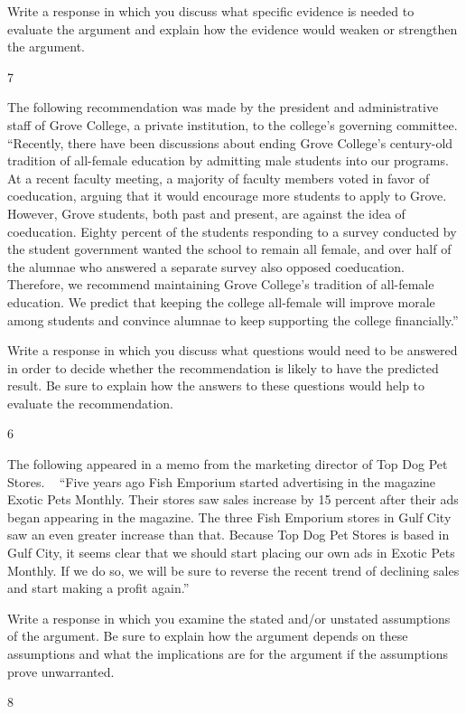 \documentclass[]{article}
\begin{document}
Write a response in which you discuss what specific evidence is needed
to evaluate the argument and explain how the evidence would weaken or
strengthen the argument.

7

The following recommendation was made by the president and
administrative staff of Grove College, a private institution, to the
college's governing committee. ``Recently, there have been discussions
about ending Grove College's century-old tradition of all-female
education by admitting male students into our programs. At a recent
faculty meeting, a majority of faculty members voted in favor of
coeducation, arguing that it would encourage more students to apply to
Grove. However, Grove students, both past and present, are against the
idea of coeducation. Eighty percent of the students responding to a
survey conducted by the student government wanted the school to remain
all female, and over half of the alumnae who answered a separate survey
also opposed coeducation. Therefore, we recommend maintaining Grove
College's tradition of all-female education. We predict that keeping the
college all-female will improve morale among students and convince
alumnae to keep supporting the college financially.''

Write a response in which you discuss what questions would need to be
answered in order to decide whether the recommendation is likely to have
the predicted result. Be sure to explain how the answers to these
questions would help to evaluate the recommendation.

6

The following appeared in a memo from the marketing director of Top Dog
Pet Stores. ~ ``Five years ago Fish Emporium started advertising in the
magazine Exotic Pets Monthly. Their stores saw sales increase by 15
percent after their ads began appearing in the magazine. The three Fish
Emporium stores in Gulf City saw an even greater increase than that.
Because Top Dog Pet Stores is based in Gulf City, it seems clear that we
should start placing our own ads in Exotic Pets Monthly. If we do so, we
will be sure to reverse the recent trend of declining sales and start
making a profit again.''

Write a response in which you examine the stated and/or unstated
assumptions of the argument. Be sure to explain how the argument depends
on these assumptions and what the implications are for the argument if
the assumptions prove unwarranted.

8
\end{document}
